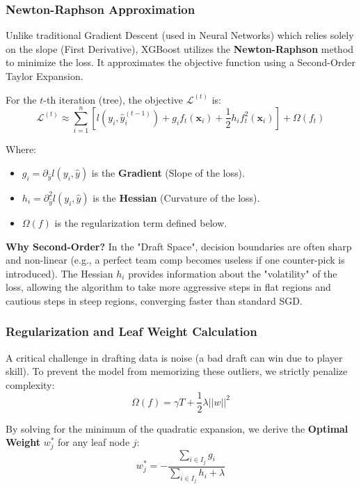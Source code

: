 \documentclass[12pt, a4paper]{article}
\begin{document}
    \subsubsection{Newton-Raphson Approximation}
    Unlike traditional Gradient Descent (used in Neural Networks) which relies solely on the slope (First Derivative), XGBoost utilizes the \textbf{Newton-Raphson} method to minimize the loss. It approximates the objective function using a Second-Order Taylor Expansion.

    For the $t$-th iteration (tree), the objective $\mathcal{L}^{(t)}$ is:
    \begin{equation}
        \mathcal{L}^{(t)} \approx \sum_{i=1}^n \left[ l(y_i, \hat{y}_i^{(t-1)}) + g_i f_t(\mathbf{x}_i) + \frac{1}{2}h_i f_t^2(\mathbf{x}_i) \right] + \Omega(f_t)
    \end{equation}

    Where:
    \begin{itemize}
        \item $g_i = \partial_{\hat{y}} l(y_i, \hat{y})$ is the \textbf{Gradient} (Slope of the loss).
        \item $h_i = \partial^2_{\hat{y}} l(y_i, \hat{y})$ is the \textbf{Hessian} (Curvature of the loss).
        \item $\Omega(f)$ is the regularization term defined below.
    \end{itemize}

    \textbf{Why Second-Order?} In the "Draft Space", decision boundaries are often sharp and non-linear (e.g., a perfect team comp becomes useless if one counter-pick is introduced). The Hessian $h_i$ provides information about the "volatility" of the loss, allowing the algorithm to take more aggressive steps in flat regions and cautious steps in steep regions, converging faster than standard SGD.

    \subsubsection{Regularization and Leaf Weight Calculation}
    A critical challenge in drafting data is noise (a bad draft can win due to player skill). To prevent the model from memorizing these outliers, we strictly penalize complexity:
    \begin{equation}
        \Omega(f) = \gamma T + \frac{1}{2}\lambda ||w||^2
    \end{equation}

    By solving for the minimum of the quadratic expansion, we derive the \textbf{Optimal Weight} $w_j^*$ for any leaf node $j$:
    \begin{equation}
        w_j^* = - \frac{\sum_{i \in I_j} g_i}{\sum_{i \in I_j} h_i + \lambda}
    \end{equation}
\end{document}
